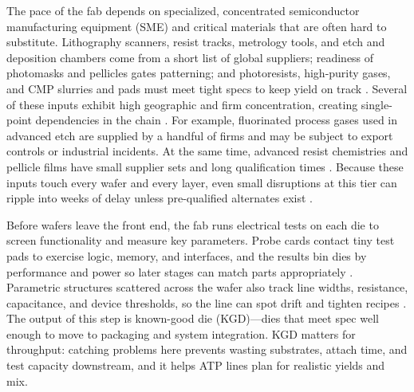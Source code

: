 The pace of the fab depends on specialized, concentrated semiconductor manufacturing equipment (SME) and critical materials that are often hard to substitute. Lithography scanners, resist tracks, metrology tools, and etch and deposition chambers come from a short list of global suppliers; readiness of photomasks and pellicles gates patterning; and photoresists, high-purity gases, and CMP slurries and pads must meet tight specs to keep yield on track \parencite{varas_strengthening_2021,semiconductor_industry_association_2025_2025}. Several of these inputs exhibit high geographic and firm concentration, creating single-point dependencies in the chain \parencite{oecd_measuring_2019}. For example, fluorinated process gases used in advanced etch are supplied by a handful of firms and may be subject to export controls or industrial incidents. At the same time, advanced resist chemistries and pellicle films have small supplier sets and long qualification times \parencite{kim_potential_2019,varas_strengthening_2021}. Because these inputs touch every wafer and every layer, even small disruptions at this tier can ripple into weeks of delay unless pre-qualified alternates exist \parencite{irds_factory_integration_technical_working_group_international_2023}.

Before wafers leave the front end, the fab runs electrical tests on each die to screen functionality and measure key parameters. Probe cards contact tiny test pads to exercise logic, memory, and interfaces, and the results bin dies by performance and power so later stages can match parts appropriately \parencite{varas_strengthening_2021}. Parametric structures scattered across the wafer also track line widths, resistance, capacitance, and device thresholds, so the line can spot drift and tighten recipes \parencite{irds_factory_integration_technical_working_group_international_2023}. The output of this step is known-good die (KGD)---dies that meet spec well enough to move to packaging and system integration. KGD matters for throughput: catching problems here prevents wasting substrates, attach time, and test capacity downstream, and it helps ATP lines plan for realistic yields and mix.

